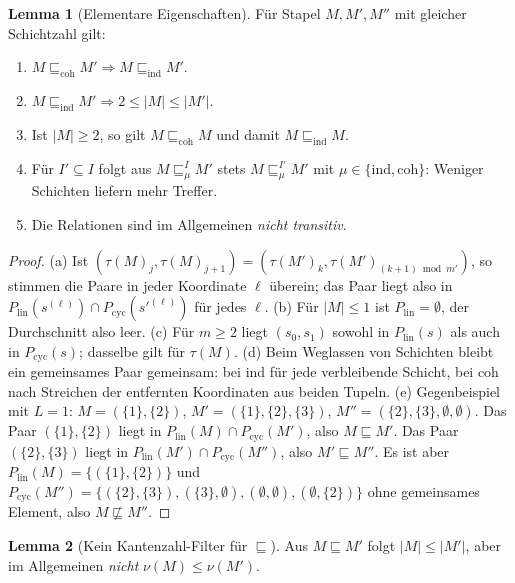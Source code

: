 \documentclass[a4paper,12pt, twoside]{report}
\theoremstyle{definition}
\newtheorem{lemma}{Lemma}
\begin{document}
\begin{lemma}[Elementare Eigenschaften]
	\label{lem:univ_eigenschaften}
	Für Stapel $M,M',M''$ mit gleicher Schichtzahl gilt:
	\begin{enumerate}[label=(\alph*)]
	\item $M\sqsubseteq_{\mathrm{coh}}M' \Rightarrow M\sqsubseteq_{\mathrm{ind}}M'$.
	\item $M\sqsubseteq_{\mathrm{ind}}M' \Rightarrow 2\le|M|\le|M'|$.
	\item Ist $|M|\ge 2$, so gilt $M\sqsubseteq_{\mathrm{coh}}M$ und damit $M\sqsubseteq_{\mathrm{ind}}M$.
	\item Für $I'\subseteq I$ folgt aus $M\sqsubseteq_{\mu}^{I}M'$ stets $M\sqsubseteq_{\mu}^{I'}M'$ mit $\mu\in\{\mathrm{ind},\mathrm{coh}\}$: Weniger Schichten liefern mehr Treffer.
	\item Die Relationen sind im Allgemeinen \emph{nicht transitiv}.
	\end{enumerate}
\end{lemma}

\begin{proof}
	(a) Ist $(\tau(M)_j,\tau(M)_{j+1})=(\tau(M')_k,\tau(M')_{(k+1)\bmod m'})$, so stimmen die Paare in jeder Koordinate $\ell$ überein; das Paar liegt also in $P_{\mathrm{lin}}(s^{(\ell)})\cap P_{\mathrm{cyc}}(s'^{(\ell)})$ für jedes $\ell$.
	(b) Für $|M|\le 1$ ist $P_{\mathrm{lin}}=\emptyset$, der Durchschnitt also leer.
	(c) Für $m\ge2$ liegt $(s_0,s_1)$ sowohl in $P_{\mathrm{lin}}(s)$ als auch in $P_{\mathrm{cyc}}(s)$; dasselbe gilt für $\tau(M)$.
	(d) Beim Weglassen von Schichten bleibt ein gemeinsames Paar gemeinsam: bei ind für jede verbleibende Schicht, bei coh nach Streichen der entfernten Koordinaten aus beiden Tupeln.
	(e) Gegenbeispiel mit $L=1$: $M=(\{1\},\{2\})$, $M'=(\{1\},\{2\},\{3\})$, $M''=(\{2\},\{3\},\emptyset,\emptyset)$. Das Paar $(\{1\},\{2\})$ liegt in $P_{\mathrm{lin}}(M)\cap P_{\mathrm{cyc}}(M')$, also $M\sqsubseteq M'$. Das Paar $(\{2\},\{3\})$ liegt in $P_{\mathrm{lin}}(M')\cap P_{\mathrm{cyc}}(M'')$, also $M'\sqsubseteq M''$. Es ist aber $P_{\mathrm{lin}}(M)=\{(\{1\},\{2\})\}$ und $P_{\mathrm{cyc}}(M'')=\{(\{2\},\{3\}),(\{3\},\emptyset),(\emptyset,\emptyset),(\emptyset,\{2\})\}$ ohne gemeinsames Element, also $M\not\sqsubseteq M''$.
\end{proof}

\begin{lemma}[Kein Kantenzahl-Filter für $\sqsubseteq$]
	\label{lem:univ_kanten}
	Aus $M\sqsubseteq M'$ folgt $|M|\le|M'|$, aber im Allgemeinen \emph{nicht} $\nu(M)\le\nu(M')$.
\end{lemma}
\end{document}
